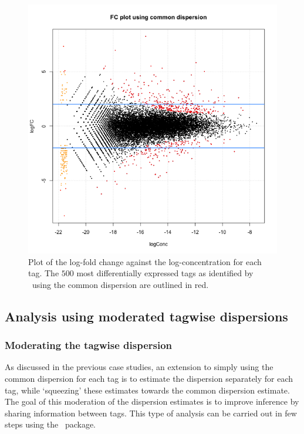 \begin{figure}[ht]
\begin{center}
\includegraphics[height=0.45\textheight]{edgeR_case_study_Li-017.png}
\caption{Plot of the log-fold change against the log-concentration for each tag. The $500$ most differentially expressed tags as identified by \edgeR~using the common dispersion are outlined in red.}
\label{fig:Li_FC1}
\end{center}
\end{figure}


\subsection{Analysis using moderated tagwise dispersions}
\subsubsection{Moderating the tagwise dispersion}
As discussed in the previous case studies, an extension to simply
using the common dispersion for each tag is to estimate the dispersion
separately for each tag, while `squeezing' these estimates towards the
common dispersion estimate. The goal of this moderation of the
dispersion estimates is to improve inference by sharing information
between tags. This type of analysis can be carried out in few steps
using the \edgeR~package.

